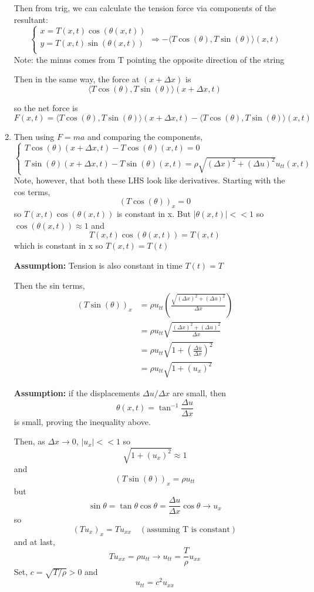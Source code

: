 \documentclass[12pt]{article}
\newcommand{\brak}[1]{\langle #1 \rangle}
\begin{document}
\begin{enumerate}
    Then from trig, we can calculate the tension force via components of the resultant:
    \[\begin{cases}
        x = T(x, t) \cos(\theta(x, t))\\
        y = T(x, t) \sin(\theta(x, t))\\ 
    \end{cases} \Longrightarrow -\brak{T\cos(\theta), T\sin(\theta)}(x, t)\]
    Note: the minus comes from T pointing the opposite direction of the string

    Then in the same way, the force at $(x + \Delta x)$ is 
    \[\brak{T\cos(\theta), T\sin(\theta)}(x + \Delta x, t)\]

    so the net force is 
    \[F(x, t) = \brak{T\cos(\theta), T\sin(\theta)}(x + \Delta x, t) - \brak{T\cos(\theta), T\sin(\theta)}(x, t)\]

    \item Then using $F = ma$ and comparing the components, 
    \[\begin{cases}
        T\cos(\theta)(x + \Delta x, t) - T\cos(\theta)(x, t) = 0\\
        T\sin(\theta)(x + \Delta x, t) - T\sin(\theta)(x, t) = \rho \sqrt{(\Delta x)^2 + (\Delta u)^2} u_{tt}(x, t)
    \end{cases}\]
    Note, however, that both these LHS look like derivatives. 
    Starting with the cos terms,
    \[(T\cos(\theta))_x = 0\]
    so $T(x, t)\cos(\theta(x, t))$ is constant in x. 
    But $|\theta(x, t)| << 1$ so $\cos(\theta(x, t)) \approx 1$ and 
    \[T(x, t) \cos(\theta(x, t)) = T(x, t)\]
    which is constant in x so $T(x, t) = T(t)$ 

    \textbf{Assumption:} Tension is also constant in time $T(t) = T$

    Then the sin terms, 
    \begin{align*}
        (T\sin(\theta))_x &= \rho u_{tt} \left(\frac{\sqrt{(\Delta x)^2 + (\Delta u)^2}}{\Delta x}\right)\\
        &= \rho u_{tt} \sqrt{\frac{(\Delta x)^2 + (\Delta u)^2}{\Delta x}} \\
        &= \rho u_{tt}  \sqrt{1 + \left(\frac{\Delta u}{\Delta x}\right)^2} \\
        &= \rho u_{tt} \sqrt{1 + (u_x)^2}
    \end{align*}

    \textbf{Assumption:} if the displacements $\Delta u/\Delta x$ are small, then 
    \[\theta(x, t) = \tan^{-1}\frac{\Delta u}{\Delta x}\]
    is small, proving the inequality above. 

    Then, as $\Delta x \to 0$, $|u_x| << 1$ so 
    \[\sqrt{1 + (u_x)^2} \approx 1\]
    and 
    \[(T\sin(\theta))_x = \rho u_{tt}\]
    but 
    \[\sin \theta  = \tan \theta \cos \theta = \frac{\Delta u}{\Delta x} \cos \theta \to u_x\]
    so 
    \[(Tu_x)_x = Tu_{xx} \quad (\text{assuming T is constant})\] 
    and at last, 
    \[Tu_{xx} = \rho u_{tt} \longrightarrow u_{tt} = \frac{T}{\rho}u_{xx}\]
    Set, $c = \sqrt{T / \rho} > 0$ and 
    \[\boxed{u_{tt} = c^2 u_{xx}}\]
\end{enumerate} 
\end{document}
